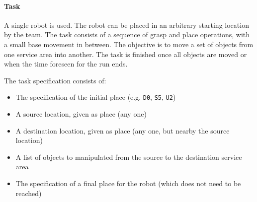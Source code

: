 \paragraph{Task}
A single robot is used. The robot can be placed in an arbitrary starting location by the team. The task consists of a sequence of grasp and place operations, with a small base movement in between. The objective is to move a set of objects from one service area into another. The task is finished once all objects are moved or when the time foreseen for the run ends.
\par
The task specification consists of:
\begin{itemize}
	\item The specification of the initial place (e.g. \texttt{D0}, \texttt{S5}, \texttt{U2})
	\item A source location, given as place (any one)
	\item A destination location, given as place (any one, but nearby the source location)
	\item A list of objects to manipulated from the source to the destination service area
	\item The specification of a final place for the robot (which does not need to be reached)
\end{itemize}

